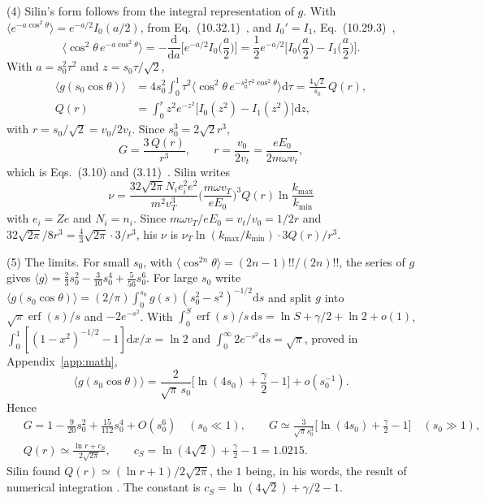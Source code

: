 \documentclass[11pt]{article}
\numberwithin{equation}{section}
\newcommand{\nuT}{\nu_T}
\newcommand{\dd}{\mathrm d}
\DeclareMathOperator{\erf}{erf}
\begin{document}
{\noindent}(4) Silin's form follows from the integral representation of $g$.
With $\langle e^{-a\cos^2\theta}\rangle=e^{-a/2}I_0(a/2)$, from
Eq.~(10.32.1)~\cite{DLMF}, and $I_0'=I_1$, Eq.~(10.29.3)~\cite{DLMF},
\begin{equation}
\big\langle\cos^2\theta\,e^{-a\cos^2\theta}\big\rangle=-\frac{\dd}{\dd a}\Big[e^{-a/2}I_0\Big(\frac a2\Big)\Big]
=\frac12e^{-a/2}\Big[I_0\Big(\frac a2\Big)-I_1\Big(\frac a2\Big)\Big].
\end{equation}
With $a=s_0^2\tau^2$ and $z=s_0\tau/\sqrt2$,
\begin{equation}
\begin{aligned}
\langle g(s_0\cos\theta)\rangle&=4s_0^2\int_0^1\tau^2\big\langle\cos^2\theta\,e^{-s_0^2\tau^2\cos^2\theta}\big\rangle\dd\tau
=\frac{4\sqrt2}{s_0}\,Q(r),\\
Q(r)&=\int_0^rz^2e^{-z^2}\big[I_0(z^2)-I_1(z^2)\big]\dd z,
\end{aligned}
\end{equation}
with $r=s_0/\sqrt2=v_0/2v_t$. Since $s_0^3=2\sqrt2r^3$,
\begin{equation}
\boxed{\;G=\frac{3\,Q(r)}{r^3},\qquad r=\frac{v_0}{2v_t}=\frac{eE_0}{2m\omega v_t},\;}
\label{eq:silin-Q}
\end{equation}
which is Eqs.~(3.10) and (3.11)~\cite{Silin1965}. Silin writes
\begin{equation}
\nu=\frac{32\sqrt{2\pi}N_ie_i^2e^2}{m^2v_T^3}\Big(\frac{m\omega v_T}{eE_0}\Big)^3Q(r)\ln\frac{k_{\max}}{k_{\min}}
\end{equation}
with $e_i=Ze$ and $N_i=n_i$. Since $m\omega v_T/eE_0=v_t/v_0=1/2r$ and
$32\sqrt{2\pi}/8r^3=\tfrac43\sqrt{2\pi}\cdot3/r^3$, his $\nu$ is
$\nuT\ln(k_{\max}/k_{\min})\cdot3Q(r)/r^3$.

{\noindent}(5) The limits. For small $s_0$, with
$\langle\cos^{2n}\theta\rangle=(2n-1)!!/(2n)!!$, the series of $g$ gives
$\langle g\rangle=\tfrac23s_0^2-\tfrac{3}{10}s_0^4+\tfrac{5}{56}s_0^6$. For large
$s_0$ write $\langle g(s_0\cos\theta)\rangle=(2/\pi)\int_0^{s_0}g(s)(s_0^2-s^2)^{-1/2}\dd s$
and split $g$ into $\sqrt\pi\erf(s)/s$ and $-2e^{-s^2}$. With
$\int_0^S\erf(s)/s\,\dd s=\ln S+\gamma/2+\ln2+o(1)$,
$\int_0^1[(1-x^2)^{-1/2}-1]\dd x/x=\ln2$ and $\int_0^\infty2e^{-s^2}\dd s=\sqrt\pi$,
proved in Appendix~\ref{app:math},
\begin{equation}
\langle g(s_0\cos\theta)\rangle=\frac{2}{\sqrt\pi\,s_0}\Big[\ln(4s_0)+\frac\gamma2-1\Big]+o(s_0^{-1}).
\end{equation}
Hence
\begin{equation}
\boxed{\;\begin{aligned}
&G=1-\frac{9}{20}s_0^2+\frac{15}{112}s_0^4+O(s_0^6)\quad(s_0\ll1),\qquad
G\simeq\frac{3}{\sqrt\pi s_0^3}\Big[\ln(4s_0)+\frac\gamma2-1\Big]\quad(s_0\gg1),\\
&Q(r)\simeq\frac{\ln r+c_S}{2\sqrt{2\pi}},\qquad c_S=\ln(4\sqrt2)+\frac\gamma2-1=1.0215.
\end{aligned}\;}
\label{eq:G-limits}
\end{equation}
Silin found $Q(r)\simeq(\ln r+1)/2\sqrt{2\pi}$, the $1$ being, in his words,
the result of numerical integration \cite[Eq.~(3.13)]{Silin1965}. The
constant is $c_S=\ln(4\sqrt2)+\gamma/2-1$.
\end{document}
